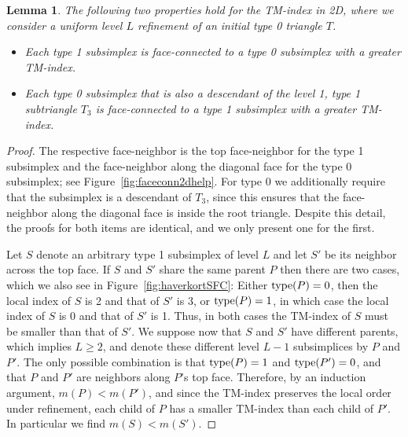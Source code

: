 \documentclass[a4paper,11pt]{article}
\newtheorem{lem}[thm]{Lemma}
\begin{document}
\begin{lem}
  \label{lem:faceconn2dhelp}
  The following two properties hold for the TM-index in 2D, where we consider a
  uniform level $L$ refinement of an initial type 0 triangle $T$.
  \begin{itemize}
    \item Each type 1 subsimplex is face-connected to a type 0
      subsimplex with a greater TM-index.
    \item Each type 0 subsimplex that is also a descendant of the level 1,
      type 1 subtriangle $T_3$
      is face-connected to a type 1 subsimplex with a greater TM-index.
  \end{itemize}
\end{lem}
\begin{proof}
  The respective face-neighbor is the top face-neighbor for the type 1 subsimplex
  and the face-neighbor along the diagonal face for the type 0 subsimplex;
  see Figure~\ref{fig:faceconn2dhelp}.
  For type 0 we additionally require that the subsimplex is
  a descendant of $T_3$, since this ensures that the face-neighbor along the
  diagonal face is inside the root triangle.
  Despite this detail, the proofs for both items are identical, and we only
  present one for the first.

  Let $S$ denote an arbitrary type 1 subsimplex of level $L$ and let $S'$ be
  its neighbor across the top face.
  If $S$ and $S'$ share the same parent $P$ then there are two cases,
  which we also see in Figure~\ref{fig:haverkortSFC}:
  Either $\operatorname{type}(P) = 0$, then the local index of $S$ is 2 and that of $S'$ is
  3, or $\operatorname{type}(P) = 1$, in which case the local index of $S$ is 0 and that
  of $S'$ is 1.
  Thus, in both cases the TM-index of $S$ must be smaller than that of $S'$.
  We suppose now that $S$ and $S'$ have different parents, which implies
  $L\geq2$, and denote these different level $L-1$ subsimplices by $P$ and
  $P'$.
  The only possible combination is that $\operatorname{type}(P) = 1$ and $\operatorname{type}(P') = 0$, and
  that $P$ and $P'$
  are neighbors along $P$'s top face. Therefore, by an induction argument,
  $m(P) < m(P')$,
  and since the TM-index preserves the local order under refinement, each child
  of $P$ has a
  smaller TM-index than each child of $P'$.
  In particular we find $m(S)<m(S')$.
\end{proof}
\end{document}
